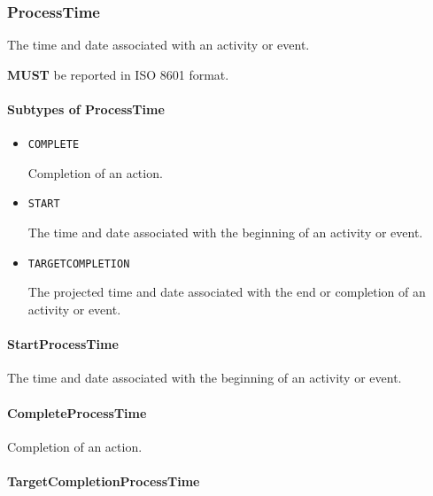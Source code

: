 \FloatBarrier

\subsubsection{ProcessTime}
\label{sec:ProcessTime}



The time and date associated with an activity or event.
  
  \textbf{MUST} be reported in ISO 8601 format.


\paragraph{Subtypes of ProcessTime}\mbox{}
\label{sec:Subtypes of ProcessTime}

\begin{itemize}

\item \texttt{COMPLETE}


Completion of an action.

\item \texttt{START}


The time and date associated with the beginning of an activity or event.

\item \texttt{TARGET\textunderscore COMPLETION}


The projected time and date associated with the end or completion of an activity or event.


\end{itemize}

\paragraph{StartProcessTime}\mbox{}
\label{sec:StartProcessTime}


The time and date associated with the beginning of an activity or event.


\paragraph{CompleteProcessTime}\mbox{}
\label{sec:CompleteProcessTime}


Completion of an action.


\paragraph{TargetCompletionProcessTime}\mbox{}
\label{sec:TargetCompletionProcessTime}



